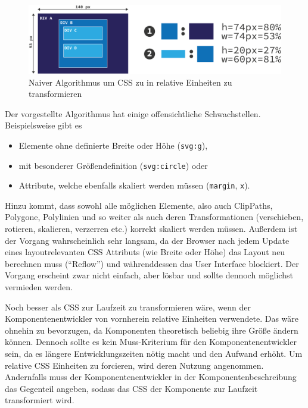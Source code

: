 \documentclass[
	headsepline,
	footsepline,
	fontsize=12pt,
	bibliography=totoc
]{scrbook}
\begin{document}
\begin{figure}[htbp]
   \centering
   \includegraphics[width=\textwidth]{images/konzeption-transform-css.png}
   \caption{Naiver Algorithmus um CSS zu in relative Einheiten zu transformieren}
   \label{figure:transform-css}
\end{figure}

Der vorgestellte Algorithmus hat einige offensichtliche Schwachstellen. Beispielsweise gibt es 

\begin{itemize}
	\item Elemente ohne definierte Breite oder Höhe (\texttt{svg:g}), 
	\item mit besonderer Größendefinition (\texttt{svg:circle}) oder
	\item Attribute, welche ebenfalls skaliert werden müssen (\texttt{margin}, \texttt{x}).
\end{itemize}

Hinzu kommt, dass sowohl alle möglichen Elemente, also auch ClipPaths, Polygone, Polylinien und so weiter als auch deren Transformationen (verschieben, rotieren, skalieren, verzerren etc.) korrekt skaliert werden müssen. Außerdem ist der Vorgang wahrscheinlich sehr langsam, da der Browser nach jedem Update eines layoutrelevanten CSS Attributs (wie Breite oder Höhe) das Layout neu berechnen muss (\enquote{Reflow}) und währenddessen das User Interface blockiert. Der Vorgang erscheint zwar nicht einfach, aber lösbar und sollte dennoch möglichst vermieden werden.


Noch besser als CSS zur Laufzeit zu transformieren wäre, wenn der Komponentenentwickler von vornherein relative Einheiten verwendete. Das wäre ohnehin zu bevorzugen, da Komponenten theoretisch beliebig ihre Größe ändern können. Dennoch sollte es kein Muss-Kriterium für den Komponentenentwickler sein, da es längere Entwicklungszeiten nötig macht und den Aufwand erhöht. Um  relative CSS Einheiten zu forcieren, wird deren Nutzung angenommen. Andernfalls muss der Komponentenentwickler in der Komponentenbeschreibung das Gegenteil angeben, sodass das CSS der Komponente zur Laufzeit transformiert wird.
\end{document}
